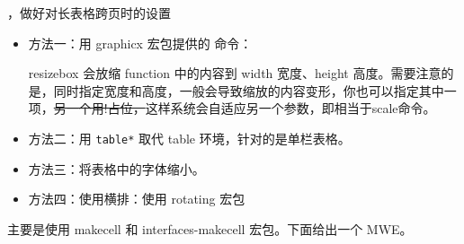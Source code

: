 



\begin{texinlist}
\usepackage{longtable}
\end{texinlist}

，做好对长表格跨页时的设置



\begin{itemize}

  \item 方法一：用 graphicx 宏包提供的  命令：
  \begin{texinlist}
  \end{texinlist}
  resizebox 会放缩 function 中的内容到 width 宽度、height
  高度。需要注意的是，同时指定宽度和高度，一般会导致缩放的内容变形，你也可以指定其中一项，\sout{另一个用!占位，}这样系统会自适应另一个参数，即相当于scale命令。
  \item 方法二：用 \texttt{table*} 取代 table 环境，针对的是单栏表格。
  \item 方法三：将表格中的字体缩小。
  \item 方法四：使用横排：使用 rotating 宏包
\end{itemize}


主要是使用 makecell 和 interfaces-makecell 宏包。下面给出一个 MWE。

